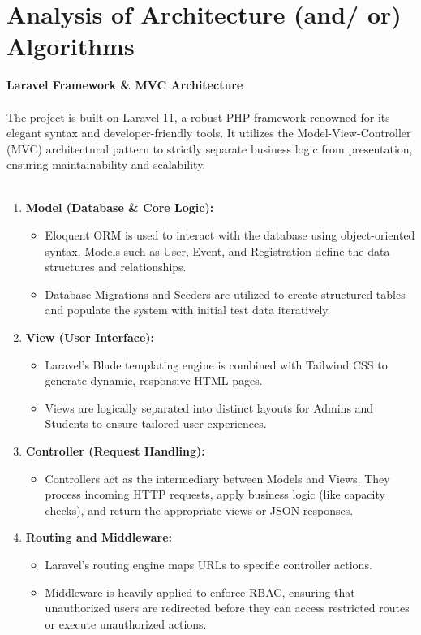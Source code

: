 \section{Analysis of Architecture (and/ or) Algorithms}
{\large \textbf{Laravel Framework \& MVC Architecture}}\\\\
The project is built on Laravel 11, a robust PHP framework renowned for its elegant syntax and developer-friendly tools. It utilizes the Model-View-Controller (MVC) architectural pattern to strictly separate business logic from presentation, ensuring maintainability and scalability.\\\\
\begin{enumerate}
    \item \textbf{Model (Database \& Core Logic):}
    \begin{itemize}
        \item Eloquent ORM is used to interact with the database using object-oriented syntax. Models such as User, Event, and Registration define the data structures and relationships.
        \item Database Migrations and Seeders are utilized to create structured tables and populate the system with initial test data iteratively.
    \end{itemize}
    \item \textbf{View (User Interface):}
    \begin{itemize}
        \item Laravel's Blade templating engine is combined with Tailwind CSS to generate dynamic, responsive HTML pages.
        \item Views are logically separated into distinct layouts for Admins and Students to ensure tailored user experiences.
    \end{itemize}
    \item \textbf{Controller (Request Handling):}
    \begin{itemize}
        \item Controllers act as the intermediary between Models and Views. They process incoming HTTP requests, apply business logic (like capacity checks), and return the appropriate views or JSON responses.
    \end{itemize}
    \item \textbf{Routing and Middleware:}
    \begin{itemize}
        \item Laravel's routing engine maps URLs to specific controller actions. 
        \item Middleware is heavily applied to enforce RBAC, ensuring that unauthorized users are redirected before they can access restricted routes or execute unauthorized actions.
    \end{itemize}
\end{enumerate}
